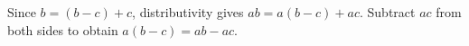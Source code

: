 Since $b=(b-c)+c$, distributivity gives $ab=a(b-c)+ac$. Subtract $ac$ from both sides to obtain $a(b-c)=ab-ac$.
